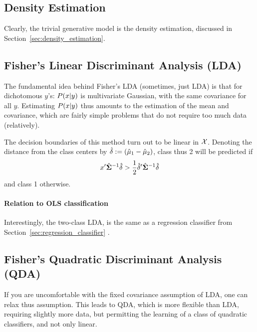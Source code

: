 \subsection{Density Estimation}
Clearly, the trivial generative model is the density estimation, discussed in Section~\ref{sec:density_estimation}.


\subsection{Fisher's Linear Discriminant Analysis (LDA)}
\label{sec:lda}
The fundamental idea behind Fisher's LDA (sometimes, just LDA) is that for dichotomous $y$'s: $P(x|y)$ is multivariate Gaussian, with the same covariance for all $y$.
Estimating $P(x|y)$ thus amounts to the estimation of the mean and covariance, which are fairly simple problems that do not require too much data (relatively).

The decision boundaries of this method turn out to be linear in $\mathcal{X}$. 
Denoting the distance from the class centers by $\hat{\mathbf{\delta}}:=(\hat{\mathbf{\mu}}_1-\hat{\mathbf{\mu}}_2)$, class thus 2 will be predicted if 
\begin{align}
	x' \hat{\mathbf{\Sigma}}^{-1} \hat{\mathbf{\delta}} > \frac{1}{2} \hat{\mathbf{\delta}}' \hat{\mathbf{\Sigma}}^{-1} \hat{\mathbf{\delta}}
\end{align}
and class 1 otherwise.


\paragraph{Relation to OLS classification}
Interestingly, the two-class LDA, is the same as a regression classifier from  Section~\ref{sec:regression_classifier} \cite[Eq. 4.11 ]{hastie_elements_2003}.



\subsection{Fisher's Quadratic Discriminant Analysis (QDA)}
If you are uncomfortable with the fixed covariance assumption of LDA, one can relax thus assumption.
This leads to QDA, which is more flexible than LDA, requiring slightly more data, but permitting the learning of a class of quadratic classifiers, and not only linear.






